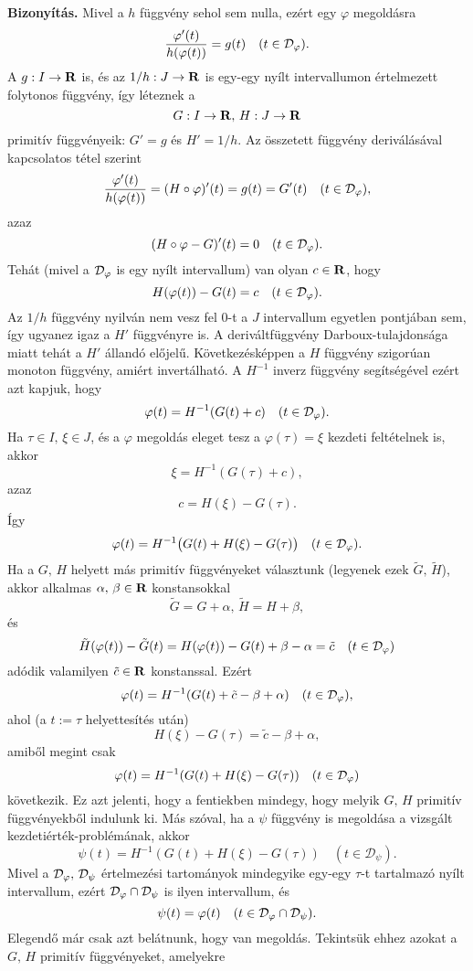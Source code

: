 \textbf{Bizonyítás.} Mivel a $h$ függvény sehol sem nulla, ezért egy $\varphi$ megoldásra
\[
\frac{\varphi'(t)}{h(\varphi(t))} = g(t) \quad (t \in \mathcal{D}_\varphi).
\]
A $g : I \to \mathbf{R}$ is, és az $1 / h : J \to \mathbf{R}$ is egy-egy nyílt intervallumon értelmezett folytonos függvény, így léteznek a
\[
G : I \to \mathbf{R}, \, H : J \to \mathbf{R}
\]
primitív függvényeik: $G' = g$ és $H' = 1/h$. Az összetett függvény deriválásával kapcsolatos tétel szerint
\[
\frac{\varphi'(t)}{h(\varphi(t))} = (H \circ \varphi)'(t) = g(t) = G'(t) \quad (t \in \mathcal{D}_\varphi),
\]
azaz
\[
(H \circ \varphi - G)'(t) = 0 \quad (t \in \mathcal{D}_\varphi).
\]
Tehát (mivel a $\mathcal{D}_\varphi$ is egy nyílt intervallum) van olyan $c \in \mathbf{R}$, hogy
\[
H(\varphi(t)) - G(t) = c \quad (t \in \mathcal{D}_\varphi).
\]
Az $1/h$ függvény nyilván nem vesz fel $0$-t a $J$ intervallum egyetlen pontjában sem, így ugyanez igaz a $H'$ függvényre is. A deriváltfüggvény Darboux-tulajdonsága miatt tehát a $H'$ állandó előjelű. Következésképpen a $H$ függvény szigorúan monoton függvény, amiért invertálható. A $H^{-1}$ inverz függvény segítségével ezért azt kapjuk, hogy
\[
\varphi(t) = H^{-1}(G(t) + c) \quad (t \in \mathcal{D}_\varphi).
\]
Ha $\tau \in I, \, \xi \in J$, és a $\varphi$ megoldás eleget tesz a $\varphi(\tau) = \xi$ kezdeti feltételnek is, akkor
\[
\xi = H^{-1}(G(\tau) + c),
\]
azaz
\[
c = H(\xi) - G(\tau).
\]
Így
\[
\varphi(t) = H^{-1}\big(G(t) + H(\xi) - G(\tau)\big)  \quad (t \in \mathcal{D}_\varphi).
\]
Ha a $G, \, H$ helyett más primitív függvényeket választunk (legyenek ezek $\tilde{G}, \, \tilde{H}$), akkor alkalmas $\alpha, \, \beta \in \mathbf{R}$ konstansokkal
\[
\tilde{G} = G + \alpha, \, \tilde{H} = H + \beta,
\]
és
\[
\tilde{H}(\varphi(t)) - \tilde{G}(t) = H(\varphi(t)) - G(t) + \beta - \alpha = \tilde{c} \quad (t \in \mathcal{D}_\varphi)
\]
adódik valamilyen $\tilde{c} \in \mathbf{R}$ konstanssal. Ezért
\[
\varphi(t) = H^{-1}(G(t) + \tilde{c} - \beta + \alpha) \quad (t \in \mathcal{D}_\varphi),
\]
ahol (a $t := \tau$ helyettesítés után)
\[
H(\xi) - G(\tau) = \tilde{c} - \beta + \alpha,
\]
amiből megint csak
\[
\varphi(t) = H^{-1}(G(t) + H(\xi) - G(\tau)) \quad (t \in \mathcal{D}_\varphi)
\]
következik. Ez azt jelenti, hogy a fentiekben mindegy, hogy melyik $G, \, H$ primitív függvényekből indulunk ki. Más szóval, ha a $\psi$ függvény is megoldása a vizsgált kezdetiérték-problémának, akkor
\[
\psi(t) = H^{-1}(G(t) + H(\xi) - G(\tau)) \quad (t \in \mathcal{D}_\psi).
\]
Mivel a $\mathcal{D}_\varphi, \, \mathcal{D}_\psi$ értelmezési tartományok mindegyike egy-egy $\tau$-t tartalmazó nyílt intervallum, ezért $\mathcal{D}_\varphi \cap \mathcal{D}_\psi$ is ilyen intervallum, és
\[
\psi(t) = \varphi(t) \quad (t \in \mathcal{D}_\varphi \cap \mathcal{D}_\psi).
\]
Elegendő már csak azt belátnunk, hogy van megoldás. Tekintsük ehhez azokat a $G, \, H$ primitív függvényeket, amelyekre
